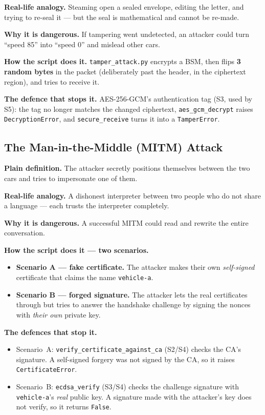 \documentclass[11pt,a4paper]{report}
\begin{document}
\textbf{Real-life analogy.} Steaming open a sealed envelope, editing the letter,
and trying to re-seal it --- but the seal is mathematical and cannot be re-made.

\textbf{Why it is dangerous.} If tampering went undetected, an attacker could
turn ``speed 85'' into ``speed 0'' and mislead other cars.

\textbf{How the script does it.} \texttt{tamper\_attack.py} encrypts a BSM, then
flips \textbf{3 random bytes} in the packet (deliberately past the header, in the
ciphertext region), and tries to receive it.

\textbf{The defence that stops it.} AES-256-GCM's authentication tag (S3, used by
S5): the tag no longer matches the changed ciphertext, \texttt{aes\_gcm\_decrypt}
raises \texttt{DecryptionError}, and \texttt{secure\_receive} turns it into a
\texttt{TamperError}.

\subsection{The Man-in-the-Middle (MITM) Attack}
\textbf{Plain definition.} The attacker secretly positions themselves between the
two cars and tries to impersonate one of them.

\textbf{Real-life analogy.} A dishonest interpreter between two people who do not
share a language --- each trusts the interpreter completely.

\textbf{Why it is dangerous.} A successful MITM could read and rewrite the entire
conversation.

\textbf{How the script does it --- two scenarios.}
\begin{itemize}
  \item \textbf{Scenario A --- fake certificate.} The attacker makes their own
        \emph{self-signed} certificate that claims the name \texttt{vehicle-a}.
  \item \textbf{Scenario B --- forged signature.} The attacker lets the real
        certificates through but tries to answer the handshake challenge by
        signing the nonces with \emph{their own} private key.
\end{itemize}

\textbf{The defences that stop it.}
\begin{itemize}
  \item Scenario~A: \texttt{verify\_certificate\_against\_ca} (S2/S4) checks the
        CA's signature. A self-signed forgery was not signed by the CA, so it
        raises \texttt{CertificateError}.
  \item Scenario~B: \texttt{ecdsa\_verify} (S3/S4) checks the challenge signature
        with \texttt{vehicle-a}'s \emph{real} public key. A signature made with
        the attacker's key does not verify, so it returns \texttt{False}.
\end{itemize}
\end{document}
